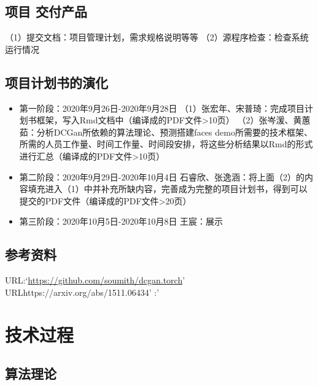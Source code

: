 \documentclass[
  hyperref, a4paper]{ctexart}
\begin{document}
\hypertarget{ux9879ux76ee-ux4ea4ux4ed8ux4ea7ux54c1}{%
\subsection{项目 交付产品}\label{ux9879ux76ee-ux4ea4ux4ed8ux4ea7ux54c1}}

（1）提交文档：项目管理计划，需求规格说明等等
（2）源程序检查：检查系统运行情况

\hypertarget{ux9879ux76eeux8ba1ux5212ux4e66ux7684ux6f14ux5316}{%
\subsection{项目计划书的演化}\label{ux9879ux76eeux8ba1ux5212ux4e66ux7684ux6f14ux5316}}

\begin{itemize}
\item
  第一阶段：2020年9月26日-2020年9月28日
  （1）张宏年、宋普琦：完成项目计划书框架，写入Rmd文档中（编译成的PDF文件\textgreater10页）
  （2）张岑湲、黄蕙茹：分析DCGan所依赖的算法理论、预测搭建faces
  demo所需要的技术框架、所需的人员工作量、时间工作量、时间段安排，将这些分析结果以Rmd的形式进行汇总（编译成的PDF文件\textgreater10页）
\item
  第二阶段：2020年9月29日-2020年10月4日
  石睿欣、张逸涵：将上面（2）的内容填充进入（1）中并补充所缺内容，完善成为完整的项目计划书，得到可以提交的PDF文件（编译成的PDF文件\textgreater20页）
\item
  第三阶段：2020年10月5日-2020年10月8日 王宸：展示
\end{itemize}

\hypertarget{ux53c2ux8003ux8d44ux6599}{%
\subsection{参考资料}\label{ux53c2ux8003ux8d44ux6599}}

URL:`\url{https://github.com/soumith/dcgan.torch}'
URLhttps://arxiv.org/abs/1511.06434' :'

\hypertarget{ux6280ux672fux8fc7ux7a0b}{%
\section{技术过程}\label{ux6280ux672fux8fc7ux7a0b}}

\hypertarget{ux7b97ux6cd5ux7406ux8bba}{%
\subsection{算法理论}\label{ux7b97ux6cd5ux7406ux8bba}}
\end{document}
